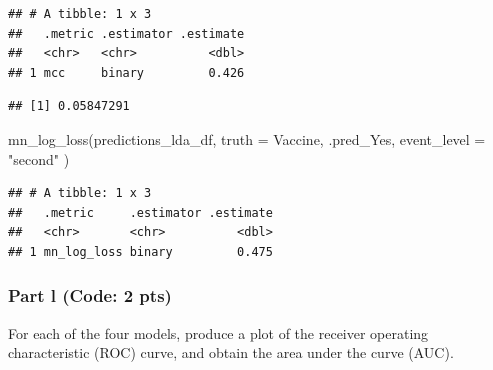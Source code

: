 \documentclass[
]{article}
\newenvironment{Shaded}{\begin{snugshade}}{\end{snugshade}}
\newcommand{\AttributeTok}[1]{\textcolor[rgb]{0.77,0.63,0.00}{#1}}
\newcommand{\DecValTok}[1]{\textcolor[rgb]{0.00,0.00,0.81}{#1}}
\newcommand{\FunctionTok}[1]{\textcolor[rgb]{0.00,0.00,0.00}{#1}}
\newcommand{\NormalTok}[1]{#1}
\newcommand{\OtherTok}[1]{\textcolor[rgb]{0.56,0.35,0.01}{#1}}
\newcommand{\SpecialCharTok}[1]{\textcolor[rgb]{0.00,0.00,0.00}{#1}}
\newcommand{\StringTok}[1]{\textcolor[rgb]{0.31,0.60,0.02}{#1}}
\begin{document}
\begin{verbatim}
## # A tibble: 1 x 3
##   .metric .estimator .estimate
##   <chr>   <chr>          <dbl>
## 1 mcc     binary         0.426
\end{verbatim}

\begin{Shaded}
\end{Shaded}

\begin{verbatim}
## [1] 0.05847291
\end{verbatim}

\begin{Shaded}
\begin{Highlighting}[]
\FunctionTok{mn\_log\_loss}\NormalTok{(predictions\_lda\_df,}
            \AttributeTok{truth =}\NormalTok{ Vaccine,}
\NormalTok{            .pred\_Yes,}
            \AttributeTok{event\_level =} \StringTok{"second"}
\NormalTok{)}
\end{Highlighting}
\end{Shaded}

\begin{verbatim}
## # A tibble: 1 x 3
##   .metric     .estimator .estimate
##   <chr>       <chr>          <dbl>
## 1 mn_log_loss binary         0.475
\end{verbatim}

\hypertarget{part-l-code-2-pts}{%
\subsubsection{Part l (Code: 2 pts)}\label{part-l-code-2-pts}}

For each of the four models, produce a plot of the receiver operating
characteristic (ROC) curve, and obtain the area under the curve (AUC).
\end{document}
